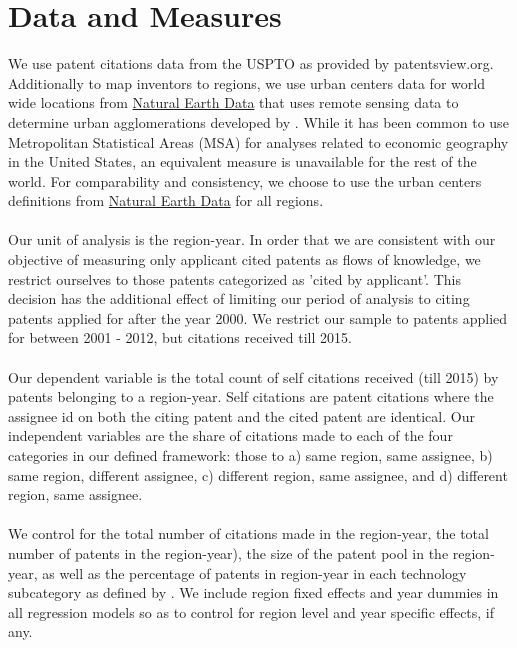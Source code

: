 \documentclass[10pt,letterpaper]{article}
\begin{document}
\section*{Data and Measures}

We use patent citations data from the USPTO as provided by patentsview.org. Additionally to map inventors to regions, we use urban centers data for world wide locations from \href{http://www.naturalearthdata.com/downloads/10m-cultural-vectors/}{Natural Earth Data} that uses remote sensing data to determine urban agglomerations developed by \cite{Schneider2003}.  While it has been common to use Metropolitan Statistical Areas (MSA) for analyses related to economic geography in the United States, an equivalent measure is unavailable for the rest of the world. For comparability and consistency, we choose to use the urban centers definitions from \href{http://www.naturalearthdata.com/downloads/10m-cultural-vectors/}{Natural Earth Data} for all regions.
\\\\
Our unit of analysis is the region-year. In order that we are consistent with our objective of measuring only applicant cited patents as flows of knowledge, we restrict ourselves to those patents categorized as 'cited by applicant'. This decision has the additional effect of limiting our period of analysis to citing patents applied for after the year 2000. We restrict our sample to patents applied for between 2001 - 2012, but citations received till 2015.
\\\\
Our dependent variable is the  total count of self citations received (till 2015) by patents belonging to a region-year. Self citations are patent citations where the assignee id on both the citing patent and the cited patent are identical. Our independent variables are the share of citations made to each of the four categories in our defined framework: those to a) same region, same assignee, b) same region, different assignee, c) different region, same assignee, and d) different region, same assignee.
\\\\
We control for the total number of citations made in the region-year, the total number of patents in the region-year), the size of the patent pool in the region-year, as well as the percentage of patents in region-year in each technology subcategory as defined by \cite{Hall2001}. We include region fixed effects and year dummies in all regression models so as to control for region level and year specific effects, if any.
\end{document}
